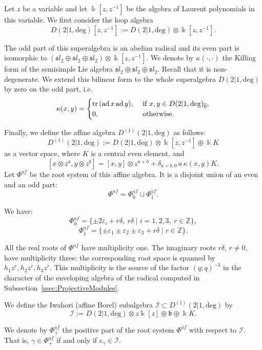 \documentclass[10pt]{amsart}
\newcommand{\Eugene}[1]{\todo[inline,color=red!30,author=Eugene]{#1}}
\newcommand{\Daniil}[1]{\todo[inline,color=orange!60,author=Daniil]{#1}}
\def\tr{{\rm tr}\,}
\newcommand{\fsl}{{\mathfrak sl}}
\newcommand{\fb}{{\mathfrak b}}
\newcommand{\Ddeg}{D(2|1,\mathrm{deg})}
\newcommand{\Daff}{D^{(1)}(2|1,\mathrm{deg})}
\begin{document}
	Let $z$ be a variable and let $\Bbbk[z,z^{-1}]$ be the algebra of Laurent polynomials in this variable. We first consider the loop algebra
	\begin{equation*}
		\Ddeg[z,z^{-1}]:=\Ddeg \otimes \Bbbk[z,z^{-1}].
	\end{equation*}
	
	The odd part of this superalgebra is an abelian radical and its even part is isomorphic to $(\fsl_2\oplus \fsl_2 \oplus \fsl_2)\otimes \Bbbk[z,z^{-1}]$. We denote by $\kappa(\cdot,\cdot)$ the Killing form of the semisimple Lie algebra $\fsl_2\oplus \fsl_2 \oplus \fsl_2$. Recall that it is non-degenerate. We extend this bilinear form to the whole superalgebra $\Ddeg$ by zero on the odd part, i.e.
	\begin{equation*}
		\kappa(x,y)=
		\begin{cases}
			\tr ({\rm ad}\, x\, {\rm ad}\, y),&~\text{if } x,y \in \Ddeg_{\overline 0},\\
			0,&~\text{otherwise.}
		\end{cases}
	\end{equation*}
	
	Finally, we define the affine algebra $\Daff$ as follows:
	\[\Daff := \Ddeg\otimes \Bbbk[z,z^{-1}] \oplus \Bbbk K\]
	as a vector space, where $K$ is a central even element, and
	\[[x \otimes z^a, y \otimes z^b]=[x,y]\otimes z^{a+b}+\delta_{a+b,0}\,a\,\kappa(x,y)K.\]
	Let $\Phi^{af}$ be the root system of this affine algebra. It is a disjoint union of an even and an odd part:
	\[\Phi^{af}=\Phi^{af}_{\overline 0} \sqcup \Phi^{af}_{\overline 1}.\]
	
	We have:
	\[\Phi^{af}_{\overline 0}=\{\pm 2 \varepsilon_i+ r \delta,~ r \delta \mid i=1,2,3,~ r \in \mathbb{Z}\},\]
	\[\Phi^{af}_{\overline 1}=\{\pm \varepsilon_1 \pm \varepsilon_2 \pm \varepsilon_3+ r \delta \mid r \in \mathbb{Z}\}.\]
	
	All the real roots of $\Phi^{af}$ have multiplicity one. The imaginary roots $r\delta$, $r \neq 0$, have multiplicity three: the corresponding root space is spanned by $h_1z^r, h_2z^r,h_3z^r$. This multiplicity is the source of the factor $(q;q)^{-3}$ in the character of the enveloping algebra of the radical computed in Subsection~\ref{ssec:ProjectiveModules}.
	
	We define the Iwahori (affine Borel) subalgebra $\mathcal{I} \subset \Daff$ by
	\[\mathcal{I}:=\Ddeg \otimes z\Bbbk[z]\oplus\fb\oplus \Bbbk K.\]
	
	We denote by $\Phi^{af}_+$ the positive part of the root system $\Phi^{af}$ with respect to $\mathcal{I}$. That is, $\gamma \in \Phi^{af}_+$ if and only if $e_{\gamma} \in \mathcal{I}$.
	
\end{document}
